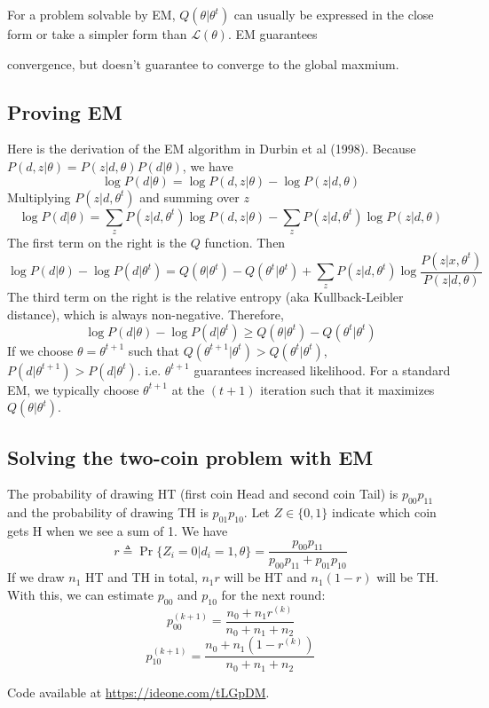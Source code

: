 \documentclass[10pt]{article}
\begin{document}
For a problem solvable by EM, $Q(\theta|\theta^t)$ can usually be expressed in
the close form or take a simpler form than $\mathcal{L}(\theta)$. EM guarantees

convergence, but doesn't guarantee to converge to the global maxmium.

\subsection{Proving EM}

Here is the derivation of the EM algorithm in Durbin et al (1998). Because
$P(d,z|\theta)=P(z|d,\theta)P(d|\theta)$, we have
$$
\log P(d|\theta)=\log P(d,z|\theta)-\log P(z|d,\theta)
$$
Multiplying $P(z|d,\theta^t)$ and summing over $z$
$$
\log P(d|\theta)=\sum_zP(z|d,\theta^t)\log P(d,z|\theta) - \sum_zP(z|d,\theta^t)\log P(z|d,\theta)
$$
The first term on the right is the $Q$ function. Then
$$
\log P(d|\theta)-\log P(d|\theta^t)=Q(\theta|\theta^t)-Q(\theta^t|\theta^t)+\sum_z P(z|d,\theta^t)\log\frac{P(z|x,\theta^t)}{P(z|d,\theta)}
$$
The third term on the right is the relative entropy (aka Kullback-Leibler
distance), which is always non-negative. Therefore,
$$
\log P(d|\theta)-\log P(d|\theta^t)\ge Q(\theta|\theta^t)-Q(\theta^t|\theta^t)
$$
If we choose $\theta=\theta^{t+1}$ such that
$Q(\theta^{t+1}|\theta^t)>Q(\theta^t|\theta^t)$,
$P(d|\theta^{t+1})>P(d|\theta^t)$. i.e. $\theta^{t+1}$ guarantees increased
likelihood. For a standard EM, we typically choose $\theta^{t+1}$ at the $(t+1)$
iteration such that it maximizes $Q(\theta|\theta^t)$.

\subsection{Solving the two-coin problem with EM}

The probability of drawing HT (first coin Head and second coin Tail) is
$p_{00}p_{11}$ and the probability of drawing TH is $p_{01}p_{10}$. Let
$Z\in\{0,1\}$ indicate which coin gets H when we see a sum of 1. We have
$$
r\triangleq\Pr\{Z_i=0|d_i=1,\theta\}=\frac{p_{00}p_{11}}{p_{00}p_{11}+p_{01}p_{10}}
$$
If we draw $n_1$ HT and TH in total, $n_1r$ will be HT and $n_1(1-r)$ will be
TH. With this, we can estimate $p_{00}$ and $p_{10}$ for the next round:
$$
p^{(k+1)}_{00}=\frac{n_0+n_1r^{(k)}}{n_0+n_1+n_2}
$$
$$
p^{(k+1)}_{10}=\frac{n_0+n_1(1-r^{(k)})}{n_0+n_1+n_2}
$$

Code available at \href{https://ideone.com/tLGpDM}{https://ideone.com/tLGpDM}.
\end{document}
